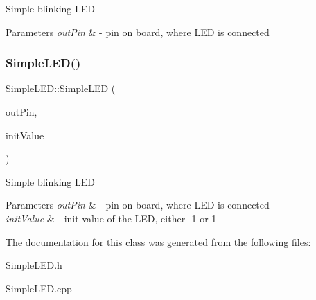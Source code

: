 Simple blinking L\+ED


\begin{DoxyParams}{Parameters}
{\em out\+Pin} & -\/ pin on board, where L\+ED is connected \\
\hline
\end{DoxyParams}
\mbox{\label{class_simple_l_e_d_a035610e281499c6a1160b2ae6b2797f0}} 
\subsubsection{\texorpdfstring{Simple\+L\+E\+D()}{SimpleLED()}\hspace{0.1cm}{\footnotesize\ttfamily [2/2]}}
{\footnotesize\ttfamily Simple\+L\+E\+D\+::\+Simple\+L\+ED (\begin{DoxyParamCaption}\item[{Pin\+Name}]{out\+Pin,  }\item[{int}]{init\+Value }\end{DoxyParamCaption})}

Simple blinking L\+ED


\begin{DoxyParams}{Parameters}
{\em out\+Pin} & -\/ pin on board, where L\+ED is connected \\
\hline
{\em init\+Value} & -\/ init value of the L\+ED, either -\/1 or 1 \\
\hline
\end{DoxyParams}


The documentation for this class was generated from the following files\+:\begin{DoxyCompactItemize}
\item 
Simple\+L\+E\+D.\+h\item 
Simple\+L\+E\+D.\+cpp\end{DoxyCompactItemize}
